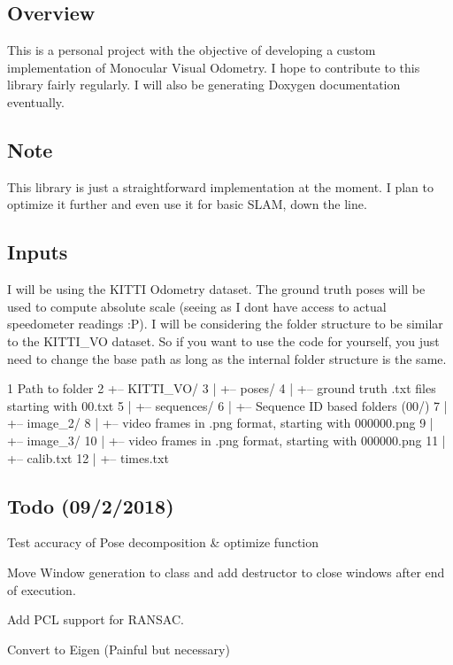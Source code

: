 \subsection*{Overview}

This is a personal project with the objective of developing a custom implementation of Monocular Visual Odometry. I hope to contribute to this library fairly regularly. I will also be generating Doxygen documentation eventually.

\subsection*{Note }

This library is just a straightforward implementation at the moment. I plan to optimize it further and even use it for basic S\+L\+AM, down the line.

\subsection*{Inputs }

I will be using the K\+I\+T\+TI Odometry dataset. The ground truth poses will be used to compute absolute scale (seeing as I don\textquotesingle{}t have access to actual speedometer readings \+:P). I will be considering the folder structure to be similar to the K\+I\+T\+T\+I\+\_\+\+VO dataset. So if you want to use the code for yourself, you just need to change the base path as long as the internal folder structure is the same.


\begin{DoxyCode}
1 Path to folder
2 +-- KITTI\_VO/
3 |   +-- poses/
4 |       +-- ground truth .txt files starting with 00.txt
5 |   +-- sequences/
6 |       +-- Sequence ID based folders (00/)
7 |           +-- image\_2/
8 |               +-- video frames in .png format, starting with 000000.png
9 |           +-- image\_3/
10 |               +-- video frames in .png format, starting with 000000.png
11 |           +-- calib.txt
12 |           +-- times.txt
\end{DoxyCode}


\subsection*{Todo (09/2/2018) }


\begin{DoxyEnumerate}
\item Test accuracy of Pose decomposition \& optimize function
\item Move Window generation to class and add destructor to close windows after end of execution.
\item Add P\+CL support for R\+A\+N\+S\+AC.
\item Convert to Eigen (Painful but necessary)
\end{DoxyEnumerate}

